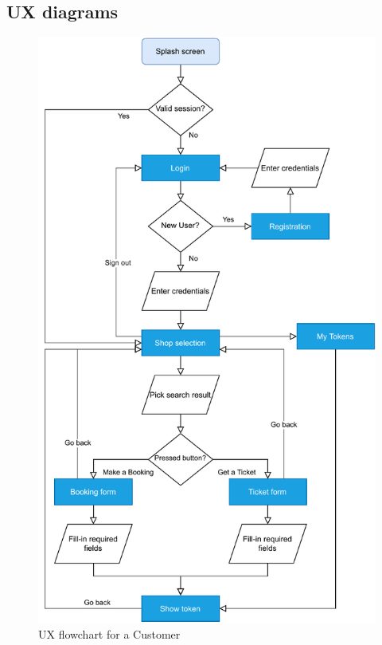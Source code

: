 \subsection{UX diagrams}
\begin{figure}[H]
    \centering
    \includegraphics[height=0.85\textheight]{Images/ux-flowchart.pdf}
    \caption{UX flowchart for a Customer}
\end{figure}
